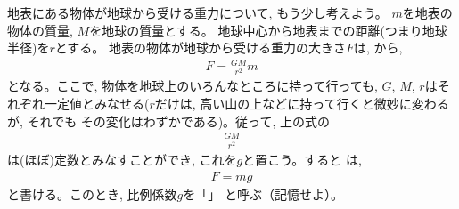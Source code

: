 地表にある物体が地球から受ける重力について, もう少し考えよう。
$m$を地表の物体の質量, $M$を地球の質量とする。
地球中心から地表までの距離(つまり地球半径)を$r$とする。
地表の物体が地球から受ける重力の大きさ$F$は, 
から, 
\begin{eqnarray}
F=\frac{GM}{r^2}m\label{eq:gravity000}
\end{eqnarray}
となる。ここで, 物体を地球上のいろんなところに持って行っても, 
$G$, $M$, $r$はそれぞれ一定値とみなせる($r$だけは, 
高い山の上などに持って行くと微妙に変わるが, それでも
その変化はわずかである)。従って, 上の式の
\begin{eqnarray}
\frac{GM}{r^2}
\end{eqnarray}
は(ほぼ)定数とみなすことができ, これを$g$と置こう。すると
は, 
\begin{eqnarray}
F=mg\label{eq:gravity_earth}
\end{eqnarray}
と書ける。このとき, 比例係数$g$を「」
と呼ぶ（記憶せよ）。

